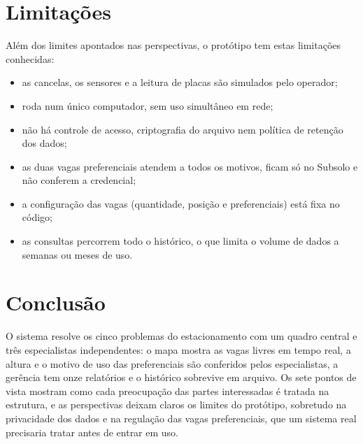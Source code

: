 \section{Limitações}
\label{sec:limitacoes}

Além dos limites apontados nas perspectivas, o protótipo tem estas limitações conhecidas:

\begin{itemize}
  \item as cancelas, os sensores e a leitura de placas são simulados pelo operador;
  \item roda num único computador, sem uso simultâneo em rede;
  \item não há controle de acesso, criptografia do arquivo nem política de retenção dos dados;
  \item as duas vagas preferenciais atendem a todos os motivos, ficam só no Subsolo e não conferem a credencial;
  \item a configuração das vagas (quantidade, posição e preferenciais) está fixa no código;
  \item as consultas percorrem todo o histórico, o que limita o volume de dados a semanas ou meses de uso.
\end{itemize}

\section{Conclusão}

O sistema resolve os cinco problemas do estacionamento com um quadro central e três especialistas independentes: o mapa mostra as vagas livres em tempo real, a altura e o motivo de uso das preferenciais são conferidos pelos especialistas, a gerência tem onze relatórios e o histórico sobrevive em arquivo. Os sete pontos de vista mostram como cada preocupação das partes interessadas é tratada na estrutura, e as perspectivas deixam claros os limites do protótipo, sobretudo na privacidade dos dados e na regulação das vagas preferenciais, que um sistema real precisaria tratar antes de entrar em uso.





